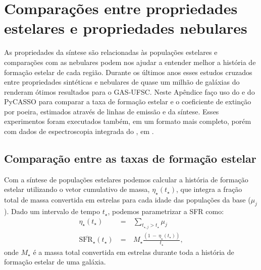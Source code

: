 

\chapter{Comparações entre propriedades estelares e propriedades nebulares}
\label{apendice:synvsneb}

As propriedades da síntese são relacionadas às populações estelares e comparações com as nebulares podem nos ajudar a entender melhor a história de formação estelar de cada região. Durante os últimos anos esses estudos cruzados entre propriedades sintéticas e nebulares de quase um milhão de galáxias do \SDSS renderam ótimos resultados para o GAS-UFSC. Neste Apêndice faço uso do \emldc e do PyCASSO para comparar a taxa de formação estelar e o coeficiente de extinção por poeira, estimados através de linhas de emissão e da síntese. Esses experimentos foram executados também, em um formato mais completo, porém com dados de espectroscopia integrada do \SDSS, em \citet{Mari2016}.


\section{Comparação entre as taxas de formação estelar}
\label{apendice:synvsneb:SFR}

Com a síntese de populações estelares podemos calcular a história de formação estelar utilizando o vetor cumulativo de massa, $\eta_\star(t_\star)$, que integra a fração total de massa convertida em estrelas para cada idade das populações da base ($\mu_j$). Dado um intervalo de tempo $t_\star$, podemos parametrizar a SFR como:
\begin{eqnarray}
	\eta_\star(t_\star)\ &=&\ \sum\limits_{t_{\star,j} > t_\star} \mu_j \\
	\overline{\mathrm{SFR}_\star}(t_\star)\ &=&\ M_\star \frac{(1\ -\ \eta_\star(t_\star))}{t_\star},
	\label{eq:SFRSyn}
\end{eqnarray}
\noindent onde $M_\star$ é a massa total convertida em estrelas durante toda a história de formação estelar de uma galáxia.

